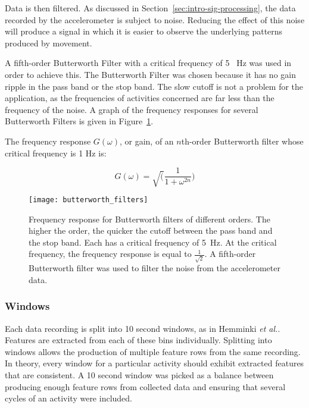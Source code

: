         Data is then filtered. As discussed in Section~\ref{sec:intro-sig-processing}, the data recorded by the accelerometer is subject to noise. Reducing the effect of this noise will produce a signal in which it is easier to observe the underlying patterns produced by movement.
        
        A fifth-order Butterworth Filter with a critical frequency of 5~  \si{Hz} was used in order to achieve this. The Butterworth Filter was chosen because it has no gain ripple in the pass band or the stop band. The slow cutoff is not a problem for the application, as the frequencies of activities concerned are far less than the frequency of the noise. A graph of the frequency responses for several Butterworth Filters is given in Figure~\ref{fig:butterworth_filters}.
        
        The frequency response $G(\omega)$, or gain, of an $n$th-order Butterworth filter whose critical frequency is 1 \si{Hz} is:
        
        $$G(\omega) = \sqrt(\frac{1}{1+\omega^{2n}})$$
        
        \begin{figure}
          \centering
          \texttt{[image: butterworth\_filters]}
          \caption[Frequency response for Butterworth filters of different orders]{Frequency response for Butterworth filters of different orders. The higher the order, the quicker the cutoff between the pass band and the stop band. Each has a critical frequency of 5~\si{Hz}. At the critical frequency, the frequency response is equal to $\frac{1}{\sqrt{2}}$. A fifth-order Butterworth filter was used to filter the noise from the accelerometer data. }
          \label{fig:butterworth_filters}
        \end{figure}
        
      \subsubsection{Windows}
        Each data recording is split into 10 second windows, as in Hemminki \emph{et al.}\cite{hemminki2013accelerometer}. Features are extracted from each of these bins individually. Splitting into windows allows the production of multiple feature rows from the same recording. In theory, every window for a particular activity should exhibit extracted features that are consistent. A 10 second window was picked as a balance between producing enough feature rows from collected data and ensuring that several cycles of an activity were included. 
      
